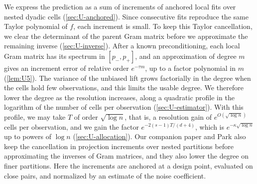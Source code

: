We express the prediction as a sum of increments of anchored local fits
over nested dyadic cells (\cref{sec:U-anchored}). Since consecutive
fits reproduce the same Taylor polynomial of $f$, each increment is
small.
To keep this Taylor cancellation, we clear the determinant of the parent
Gram matrix before we approximate the remaining inverse
(\cref{sec:U-inverse}). After a known preconditioning, each local Gram
matrix has its spectrum in $[p_-,p_+]$, and an approximation of
degree $m$ gives an increment error of relative order $e^{-\tau m}$, up to
a factor polynomial in $m$ (\cref{lem:U5}). The variance of the
unbiased lift grows factorially in the degree when the cells hold few
observations, and this limits the usable degree. We therefore lower
the degree as the resolution increases, along a quadratic profile in
the logarithm of the number of cells per observation
(\cref{sec:U-estimator}). With this profile, we may take $T$ of order
$\sqrt{\log n}$, that is, a resolution gain of $e^{O(\sqrt{\log n})}$
cells per observation, and we gain the factor $e^{-2(s-1)T/(d+4)}$, which is
$e^{-\kappa\sqrt{\log n}}$ up to powers of $\log n$
(\cref{sec:U-allocation}). Our companion paper
\cite[Sections~4.1--4.4]{AronowKallusLopatto2026} and Park
\cite[Sections~3.2--3.4]{Park2026} also keep the cancellation in
projection increments over nested partitions before approximating the
inverses of Gram matrices, and they also lower the degree on finer
partitions. Here the increments are anchored at a design point,
evaluated on close pairs, and normalized by an estimate of the noise
coefficient.

